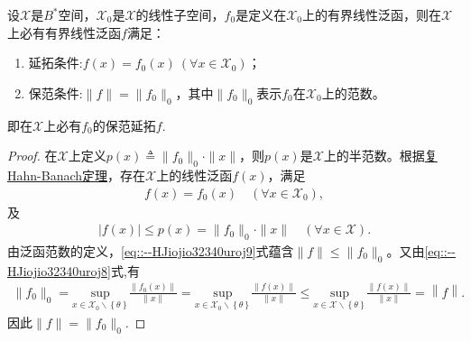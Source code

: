 \documentclass[../../main.tex]{subfiles}%
\begin{document}
\begin{theorem}\label{theorem:泛函分析--(哈恩-巴拿赫)Hahn-Banach定理}
设$\mathscr{X}$是$B^*$空间，$\mathscr{X}_0$是$\mathscr{X}$的线性子空间，$f_0$是定义在$\mathscr{X}_0$上的有界线性泛函，则在$\mathscr{X}$上必有有界线性泛函$f$满足：
\begin{enumerate}[(1)]
\item 延拓条件:$f(x) = f_0(x) \ (\forall x \in \mathscr{X}_0)$；
\item 保范条件:$\|f\| = \|f_0\|_0$，其中$\|f_0\|_0$表示$f_0$在$\mathscr{X}_0$上的范数。
\end{enumerate}
即在$\mathscr{X}$上必有$f_0$的保范延拓$f$.
\end{theorem}
\begin{proof}

在$\mathscr{X}$上定义$p(x) \triangleq \|f_0\|_0 \cdot \|x\|$，则$p(x)$是$\mathscr{X}$上的半范数。根据\hyperref[theorem:泛函分析--复Hahn-Banach定理]{复Hahn-Banach定理}，存在$\mathscr{X}$上的线性泛函$f(x)$，满足
\begin{align}
f(x) = f_0(x) \quad (\forall x \in \mathscr{X}_0), \label{eq::--HJiojio32340uroj8}
\end{align}
及
\begin{align}
|f(x)| \leqslant p(x) = \|f_0\|_0 \cdot \|x\| \quad (\forall x \in \mathscr{X}). \label{eq::--HJiojio32340uroj9}
\end{align}
由泛函范数的定义，\eqref{eq::--HJiojio32340uroj9}式蕴含$\|f\| \leqslant \|f_0\|_0$。又由\eqref{eq::--HJiojio32340uroj8}式,有
\begin{align*}
\parallel f_0\parallel _0=\underset{x\in \mathscr{X} _0\backslash \left\{ \theta \right\}}{\mathrm{sup}}\frac{\left\| f_0\left( x \right) \right\|}{\left\| x \right\|}=\underset{x\in \mathscr{X} _0\backslash \left\{ \theta \right\}}{\mathrm{sup}}\frac{\left\| f\left( x \right) \right\|}{\left\| x \right\|}\leqslant \underset{x\in \mathscr{X} \backslash \left\{ \theta \right\}}{\mathrm{sup}}\frac{\left\| f\left( x \right) \right\|}{\left\| x \right\|}=\left\| f \right\| .
\end{align*}
因此$\|f\| = \|f_0\|_0$.

\end{proof}
\end{document}
